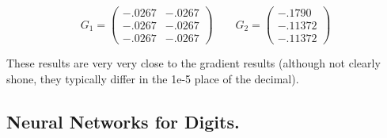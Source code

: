 \documentclass{article}
\begin{document}
\begin{enumerate}[(a)]
    $$G_1 = \begin{pmatrix} -.0267 & -.0267 \\ -.0267 & -.0267 \\ -.0267 & -.0267 \end{pmatrix}
      \qquad
      G_2 = \begin{pmatrix} -.1790 \\ -.11372 \\ -.11372 \end{pmatrix}$$

        These results are very very close to the gradient results (although not clearly shone,
        they typically differ in the 1e-5 place of the decimal).

\end{enumerate}


\subsection*{Neural Networks for Digits.}
\end{document}
